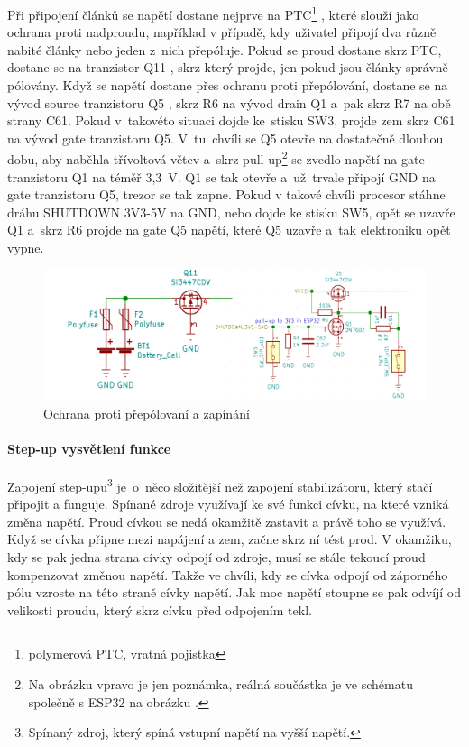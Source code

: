 Při připojení článků se napětí dostane nejprve na PTC\footnote{polymerová PTC, vratná pojistka } \parencite{polyfuse},
které slouží jako ochrana proti nadproudu, například v případě, kdy uživatel připojí dva různě nabité články nebo jeden z~nich přepóluje.
Pokud se proud dostane skrz PTC, dostane se na tranzistor Q11 \parencite{power_MOSFET}, skrz který projde, jen pokud jsou články správně pólovány.
Když se napětí dostane přes ochranu proti přepólování, dostane se na 
vývod source
tranzistoru Q5 \parencite{power_MOSFET}, skrz R6 na vývod drain
Q1 a~pak skrz R7 na obě strany C61.
Pokud v~takovéto situaci dojde ke~stisku SW3, projde zem skrz C61 na vývod gate tranzistoru Q5. 
V~tu~chvíli se Q5 otevře na dostatečně dlouhou dobu, 
aby naběhla třívoltová větev a~skrz pull-up\footnote{Na obrázku  vpravo je jen poznámka, reálná součástka je ve schématu společně s ESP32 na obrázku .}
se zvedlo napětí na gate tranzistoru Q1 na téměř 3,3~V. Q1 se tak otevře a~už~trvale připojí GND na gate tranzistoru Q5, trezor se tak zapne. Pokud v takové chvíli procesor stáhne dráhu SHUTDOWN 3V3-5V 
na GND, nebo dojde ke stisku SW5, opět se uzavře Q1 a~skrz R6 projde na gate Q5 napětí, které Q5 uzavře a~tak elektroniku opět vypne.

\begin{figure}[h]
    \centering
    \includegraphics[width=\textwidth]{kapitoly/obrazky/E4/napajeni/ochrana_proti_prepolovani_a_zapinani.png}
    \caption{Ochrana proti přepólovaní a zapínání}
    \label{fig:E4-zapinani}
\end{figure}



\paragraph*{Step-up vysvětlení funkce}
Zapojení step-upu\footnote{Spínaný zdroj, který spíná vstupní napětí na vyšší napětí.} je~o~něco složitější než zapojení stabilizátoru, 
který stačí připojit a funguje. 
Spínané zdroje využívají ke své funkci cívku, na které vzniká změna napětí. Proud cívkou se nedá okamžitě zastavit a právě toho se využívá. 
Když se cívka připne mezi napájení a zem, začne skrz ní tést prod. V okamžiku, kdy se pak jedna strana cívky odpojí od zdroje, 
musí se stále tekoucí proud kompenzovat změnou napětí.
Takže ve chvíli, kdy se cívka odpojí od záporného pólu vzroste na této straně cívky napětí. 
Jak moc napětí stoupne se pak odvíjí od velikosti proudu, který skrz cívku před odpojením tekl.

